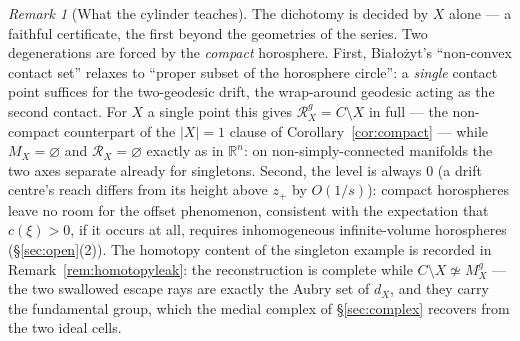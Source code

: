 \documentclass[11pt]{article}
\theoremstyle{remark}
\newtheorem{remark}[theorem]{Remark}
\newcommand{\R}{\mathbb{R}}
\newcommand{\X}{X}
\newcommand{\Mx}{M_{\X}}
\newcommand{\Mg}{M^{g}_{\X}}
\newcommand{\Rx}{\mathcal{R}_{\X}}
\newcommand{\Rg}{\mathcal{R}^{g}_{\X}}
\newcommand{\dX}{d_{\X}}
\begin{document}
\begin{remark}[What the cylinder teaches]\label{rem:cylinder}
The dichotomy is decided by $\X$ alone --- a faithful certificate,
the first beyond the geometries of the series. Two degenerations are
forced by the \emph{compact} horosphere. First, Bia\l{}o\.zyt's
``non-convex contact set'' relaxes to ``proper subset of the
horosphere circle'': a \emph{single} contact point suffices for the
two-geodesic drift, the wrap-around geodesic acting as the second
contact. For $\X$ a single point this gives $\Rg=C\setminus\X$ in
full --- the non-compact counterpart of the $|\X|=1$ clause of
Corollary~\ref{cor:compact} --- while $\Mx=\varnothing$ and
$\Rx=\varnothing$ exactly as in $\R^{n}$: on non-simply-connected
manifolds the two axes separate already for singletons. Second, the
level is always $0$ (a drift centre's reach differs from its height
above $z_{+}$ by $O(1/s)$): compact horospheres leave no room for
the offset phenomenon, consistent with the expectation that
$c(\xi)>0$, if it occurs at all, requires inhomogeneous
infinite-volume horospheres (\S\ref{sec:open}(2)). The homotopy
content of the singleton example is recorded in
Remark~\ref{rem:homotopyleak}: the reconstruction is complete while
$C\setminus\X\not\simeq\Mg$ --- the two swallowed escape rays are
exactly the Aubry set of $\dX$, and they carry the fundamental
group, which the medial complex of \S\ref{sec:complex} recovers
from the two ideal cells.
\end{remark}
\end{document}
